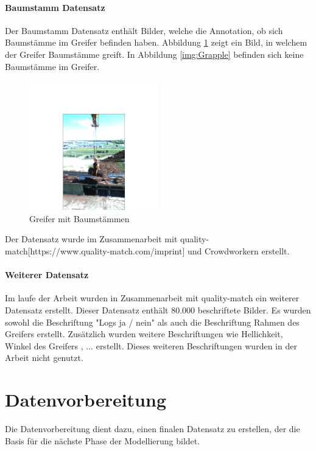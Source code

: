 		\paragraph{Baumstamm Datensatz} Der Baumstamm Datensatz enthält Bilder, welche die Annotation, ob sich Baumstämme im Greifer befinden haben. Abbildung \ref{img:Logs} zeigt ein Bild, in welchem der Greifer Baumstämme greift. In Abbildung \ref{img:Grapple} befinden sich keine Baumstämme im Greifer.
		\begin{figure}[h]
			\centering
			\includegraphics[width=0.5\textwidth, center]{bilder/Grundlagen/Logs_14.png}
			\caption[Bsp. Bild: Greifer mit Baumstämmen]{Greifer mit Baumstämmen}
			\label{img:Logs}
		\end{figure}
		Der Datensatz wurde im Zusammenarbeit mit quality-match[https://www.quality-match.com/imprint] und Crowdworkern erstellt.  

		\paragraph{Weiterer Datensatz}
		Im laufe der Arbeit wurden in Zusammenarbeit mit quality-match ein weiterer Datensatz erstellt. Dieser Datensatz enthält  80.000 beschriftete Bilder. Es wurden sowohl die Beschriftung "Logs ja / nein" als auch die Beschriftung  Rahmen des Greifers erstellt. Zusätzlich wurden weitere Beschriftungen wie Hellichkeit, Winkel des Greifers , ... erstellt. Dieses weiteren Beschriftungen wurden in der Arbeit nicht genutzt.		
	
		
	\section{Datenvorbereitung}
	\label{sec:DataPreparation}

Die Datenvorbereitung dient dazu, einen finalen Datensatz zu erstellen, der die Basis für die nächste Phase der Modellierung bildet.


